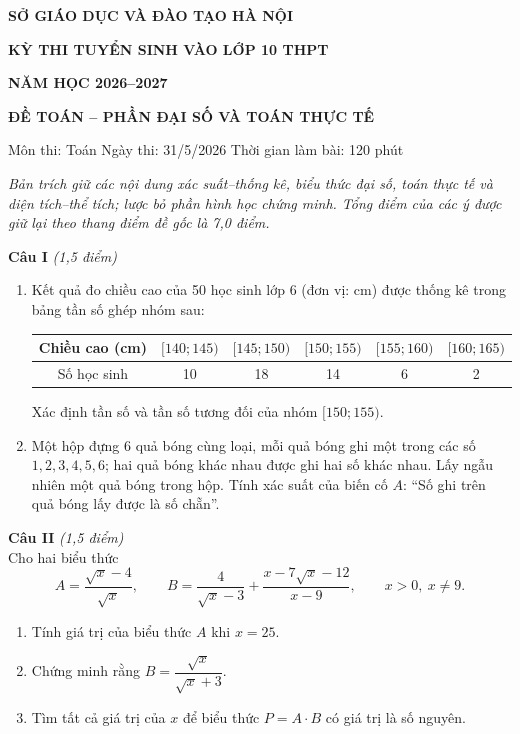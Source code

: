 \documentclass[12pt,a4paper]{article}
\newcommand{\diem}[1]{\textit{(#1 điểm)}}
\begin{document}
\begin{center}
  {\large\bfseries SỞ GIÁO DỤC VÀ ĐÀO TẠO HÀ NỘI}\par
  {\Large\bfseries KỲ THI TUYỂN SINH VÀO LỚP 10 THPT}\par
  {\large\bfseries NĂM HỌC 2026--2027}\par
  \vspace{0.35em}
  {\large\bfseries ĐỀ TOÁN -- PHẦN ĐẠI SỐ VÀ TOÁN THỰC TẾ}\par
  Môn thi: Toán \qquad Ngày thi: 31/5/2026 \qquad Thời gian làm bài: 120 phút
\end{center}
\textit{Bản trích giữ các nội dung xác suất--thống kê, biểu thức đại số, toán thực tế và diện tích--thể tích; lược bỏ phần hình học chứng minh. Tổng điểm của các ý được giữ lại theo thang điểm đề gốc là 7,0 điểm.}

\textbf{Câu I} \diem{1,5}
\begin{enumerate}
  \item Kết quả đo chiều cao của 50 học sinh lớp 6 (đơn vị: cm) được thống kê trong bảng tần số ghép nhóm sau:
  \begin{center}
    \renewcommand{\arraystretch}{1.25}
    \begin{tabular}{|c|c|c|c|c|c|}\hline
      Chiều cao (cm) & $[140;145)$ & $[145;150)$ & $[150;155)$ & $[155;160)$ & $[160;165)$ \\ \hline
      Số học sinh & 10 & 18 & 14 & 6 & 2 \\ \hline
    \end{tabular}
  \end{center}
  Xác định tần số và tần số tương đối của nhóm $[150;155)$.

  \item Một hộp đựng 6 quả bóng cùng loại, mỗi quả bóng ghi một trong các số $1,2,3,4,5,6$; hai quả bóng khác nhau được ghi hai số khác nhau. Lấy ngẫu nhiên một quả bóng trong hộp. Tính xác suất của biến cố $A$: ``Số ghi trên quả bóng lấy được là số chẵn''.
\end{enumerate}

\textbf{Câu II} \diem{1,5}\\
Cho hai biểu thức
\[
 A=\frac{\sqrt{x}-4}{\sqrt{x}},\qquad
 B=\frac{4}{\sqrt{x}-3}+\frac{x-7\sqrt{x}-12}{x-9},
 \qquad x>0,\ x\ne 9.
\]
\begin{enumerate}
  \item Tính giá trị của biểu thức $A$ khi $x=25$.
  \item Chứng minh rằng $B=\dfrac{\sqrt{x}}{\sqrt{x}+3}$.
  \item Tìm tất cả giá trị của $x$ để biểu thức $P=A\cdot B$ có giá trị là số nguyên.
\end{enumerate}
\end{document}
